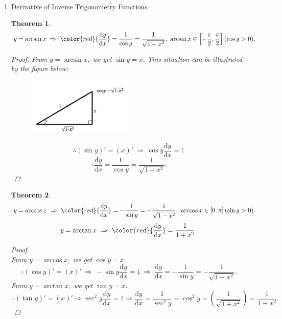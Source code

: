 \documentclass[12pt, a4paper]{article}
\newtheorem{theorem}{Theorem}[subsection]
\newtheorem{example}{Example}[subsection]
\newtheorem{proof}{Proof}[subsection]
\begin{document}
\begin{enumerate}
\begin{example}
        $$\frac{\mathrm{d}^2y}{\mathrm{d}x^2}=\frac{-2-2\left(\frac{\mathrm{d}y}{\mathrm{d}x}\right)^2}{2y}=\frac{-2-2\left(-\frac{x}{y}\right)^2}{2y}.$$
    \end{example}
    \item Derivative of Inverse Trigonometry Functions
    \begin{theorem}
        $$y=\arcsin x\ \Rightarrow\ {\color{red}{\frac{\mathrm{d}y}{\mathrm{d}x}}=\frac{1}{\cos y}=\frac{1}{\sqrt{1-x^2}}},\ \arcsin x\in\left[-\frac{\pi}{2},\frac{\pi}{2}\right](\cos y>0).$$
        \begin{proof}
            From $y=\arcsin x,$ we get $\sin y=x$. This situation can be illustrated by the figure below: 
            \begin{figure}[H]
                \centering 
                \includegraphics[width=0.5\textwidth]{Fig.5.5.jpg} 
            \end{figure}
            $$\therefore (\sin y)'=(x)'\ \Rightarrow\ \cos y\frac{\mathrm{d}y}{\mathrm{d}x}=1$$
            $$\therefore \frac{\mathrm{d}y}{\mathrm{d}x}=\frac{1}{\cos y}=\frac{1}{\sqrt{1-x^2}}.$$
        \end{proof}
    \end{theorem}
    \begin{theorem}
        $$y=\arccos x\ \Rightarrow\ {\color{red}{\frac{\mathrm{d}y}{\mathrm{d}x}}=-\frac{1}{\sin y}=-\frac{1}{\sqrt{1-x^2}}},\ \arccos x\in\left[0,\pi\right](\sin y>0).$$
        $$y=\arctan x\ \Rightarrow\ {\color{red}{\frac{\mathrm{d}y}{\mathrm{d}x}}=\frac{1}{1+x^2}}.$$
        \begin{proof}
            {\color{green}{(Hint: Try to visualize a similar diagram as in proof 4.1.)}}\\
            From $y=\arccos x,$ we get $\cos y=x$. 
            $$\therefore (\cos y)'=(x)'\ \Rightarrow\ -\sin y\frac{\mathrm{d}y}{\mathrm{d}x}=1\ \Rightarrow\ \frac{\mathrm{d}y}{\mathrm{d}x}=-\frac{1}{\sin y}=-\frac{1}{\sqrt{1-x^2}}.$$
            From $y=\arctan x,$ we get $\tan y=x$.
            $$\therefore (\tan y)'=(x)'\Rightarrow\sec^2 y\frac{\mathrm{d}y}{\mathrm{d}x}=1\Rightarrow\frac{\mathrm{d}y}{\mathrm{d}x}=\frac{1}{\sec^2 y}=\cos^2 y=\left(\frac{1}{\sqrt{1+x^2}}\right)=\frac{1}{1+x^2}.$$
        \end{proof}
    \end{theorem}
\end{enumerate}
\end{document}

